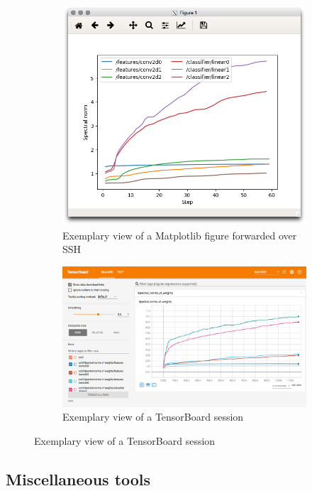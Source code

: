 \begin{figure}
    \begin{subfigure}{\textwidth}
    \hypertarget{fig:example_mpl}{%
        \centering
        \includegraphics[max width=.6\textwidth]{gfx/diagrams/software_screens/example_mpl.png}
        \caption{Exemplary view of a Matplotlib figure forwarded over SSH}\label{fig:example_mpl}
    }
\end{subfigure}

\begin{subfigure}{\textwidth}
    \hypertarget{fig:example_tb}{%
        \centering
        \includegraphics[width=\textwidth]{gfx/diagrams/software_screens/example_tb.png}
        \caption{Exemplary view of a TensorBoard session}\label{fig:example_tb}
    }
\end{subfigure}
\end{figure}

\hypertarget{sec:other-tools}{%
\subsection{Miscellaneous tools}\label{sec:other-tools}}


